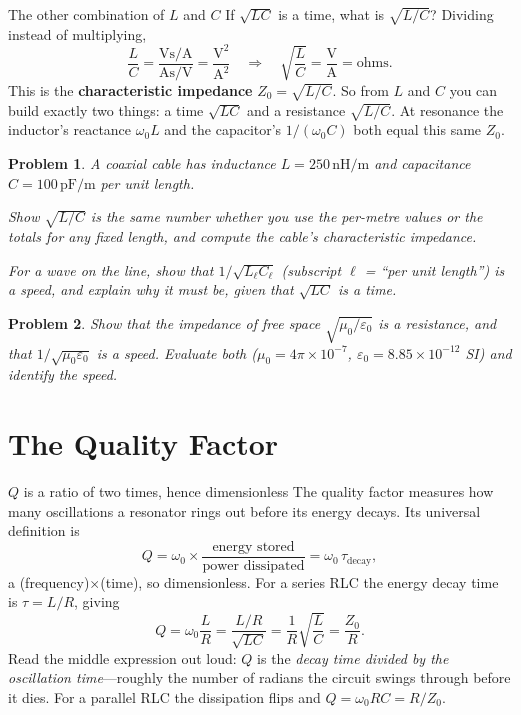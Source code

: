 \documentclass[11pt]{article}
\newcommand{\clearpts}{\addtocounter{tpts}{\value{cpts}} \setcounter{cpts}{0}}
\newcommand{\pts}[1]{\clearpts \setcounter{cpts}{#1}}
\theoremstyle{mystyle}
\newtheorem{pproblem}{Problem}
\newcommand{\V}{\text{V}}
\newcommand{\A}{\text{A}}
\newcommand{\s}{\text{s}}
\begin{document}
\begin{psidea}{The other combination of $L$ and $C$}{}
If $\sqrt{LC}$ is a time, what is $\sqrt{L/C}$? Dividing instead of multiplying,
\[
\frac{L}{C}=\frac{\V\s/\A}{\A\s/\V}=\frac{\V^2}{\A^2}
\quad\Longrightarrow\quad
\sqrt{\frac{L}{C}}=\frac{\V}{\A}=\text{ohms.}
\]
This is the \textbf{characteristic impedance} $Z_0=\sqrt{L/C}$. So from $L$ and $C$
you can build exactly two things: a time $\sqrt{LC}$ and a resistance $\sqrt{L/C}$.
At resonance the inductor's reactance $\omega_0 L$ and the capacitor's $1/(\omega_0 C)$
both equal this same $Z_0$.
\end{psidea}

\pts{4}
\begin{pproblem}
A coaxial cable has inductance $L = 250\,\text{nH/m}$ and capacitance
$C = 100\,\text{pF/m}$ per unit length.
\begin{subpart}
\item Show $\sqrt{L/C}$ is the same number whether you use the per-metre values or the
totals for any fixed length, and compute the cable's characteristic impedance.
\item For a wave on the line, show that $1/\sqrt{L_\ell C_\ell}$ (subscript $\ell$ =
``per unit length'') is a \emph{speed}, and explain why it must be, given that
$\sqrt{LC}$ is a time.
\end{subpart}
\end{pproblem}

\pts{3}
\begin{pproblem}
Show that the impedance of free space $\sqrt{\mu_0/\varepsilon_0}$ is a resistance,
and that $1/\sqrt{\mu_0\varepsilon_0}$ is a speed. Evaluate both
($\mu_0 = 4\pi\times10^{-7}$, $\varepsilon_0 = 8.85\times10^{-12}$ SI) and identify the
speed.
\end{pproblem}

\section{The Quality Factor}

\begin{psidea}{$Q$ is a ratio of two times, hence dimensionless}{}
The quality factor measures how many oscillations a resonator rings out before its
energy decays. Its universal definition is
\[
Q = \omega_0 \times \frac{\text{energy stored}}{\text{power dissipated}}
  = \omega_0 \,\tau_{\text{decay}} ,
\]
a (frequency)$\times$(time), so dimensionless. For a series RLC the energy decay time
is $\tau = L/R$, giving
\[
Q = \omega_0\frac{L}{R} = \frac{L/R}{\sqrt{LC}} = \frac{1}{R}\sqrt{\frac{L}{C}}
  = \frac{Z_0}{R}.
\]
Read the middle expression out loud: $Q$ is the \emph{decay time divided by the
oscillation time}---roughly the number of radians the circuit swings through before
it dies. For a parallel RLC the dissipation flips and $Q = \omega_0 RC = R/Z_0$.
\end{psidea}
\end{document}
